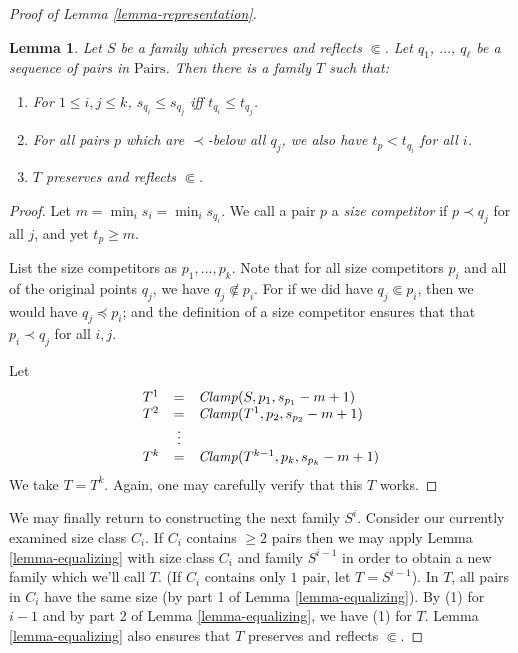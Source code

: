 \documentclass[letterpaper]{article} %
\newtheorem{lemma}[theorem]{Lemma}
\theoremstyle{definition}
\newcommand{\Pairs}{\mbox{Pairs}}
\newcommand{\Clamp}{\protect{\mbox{\textit{Clamp}}}}
\newcommand{\precsubseteq}{\Subset}
\begin{document}
\begin{proof}[Proof of Lemma \ref{lemma-representation}]
\begin{lemma}

Let $S$ be a family which  preserves and reflects $\precsubseteq$.  
Let $q_1$, $\ldots$, $q_{\ell}$ be a sequence of pairs in $\Pairs$.  
Then there is a family $T$ such that:

\begin{enumerate} 
    \item For $1\leq i,j \leq k$, $s_{q_i} \leq s_{q_j}$ iff $t_{q_i} \leq t_{q_j}$. \label{competitor1}
    
    \item For all pairs $p $ which are $\prec$-below all $q_j$, we also have $t_{p}  <  t_{q_i}$ for all $i$. \label{competitor2}
  
    \item $T$ preserves and reflects $\precsubseteq$. 

\end{enumerate}

\label{lemma-sizeadjustment}
\end{lemma}
\begin{proof}
Let $m =  \min_i s_{i} = \min_i s_{q_i}$.
We call a pair $p$ a \emph{size competitor} if 
$p\prec q_j$ for all $j$, and yet  $t_p \geq m$.

List the size competitors as $p_1, \ldots, p_k$. 
 Note that for all size competitors $p_i$ and all of the original points
 $q_j$,  we have $q_j \not \precsubseteq p_i$.
For if we did have $q_j \precsubseteq p_i$, then we would have 
$q_j \preceq p_i$; and the definition of a size competitor
ensures that that $p_i \prec q_j$ for all $i, j$.


 Let \[ \begin{array}{lcl}
 T^1  & = &  \Clamp(S,p_1,  s_{p_1} -m + 1)\\

T^2 & = & \Clamp(T^1,p_2,  s_{p_2}-m + 1 )\\
  & \vdots   & \\
T^{k} & = & \Clamp(T^{k-1},p_k, s_{p_k}-m + 1 )\\
\end{array}
\]
We take $T = T^{k}$.  Again, one may carefully verify that this $T$ works.  
\end{proof}


We may finally return to constructing the next family $S^i$.  Consider our currently examined size class $C_i$.  If $C_i$ contains $\ge 2$ pairs then we may apply Lemma \ref{lemma-equalizing} with size class $C_i$ and family $S^{i-1}$ in order to obtain a new family which we'll call $T$.  (If $C_i$ contains only $1$ pair, let $T = S^{i-1}$).  In $T$, all pairs in $C_i$ have the same size (by part 1 of Lemma \ref{lemma-equalizing}).  By (1) for $i-1$ and by part 2 of Lemma \ref{lemma-equalizing}, we have (1) for $T$.  Lemma \ref{lemma-equalizing} also ensures that $T$ preserves and reflects $\precsubseteq$.


\end{proof}
\end{document}
